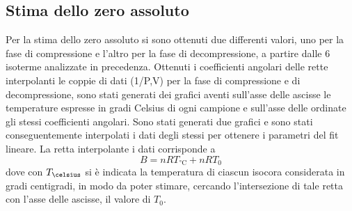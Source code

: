 \documentclass[a4paper,11pt,oneside]{article}
\begin{document}


\subsection{Stima dello zero assoluto}
Per la stima dello zero assoluto si sono ottenuti due differenti valori, uno per la fase di compressione e l'altro per la fase di decompressione, a partire dalle 6 isoterme analizzate in precedenza.
Ottenuti i coefficienti angolari delle rette interpolanti le coppie di dati (1/P,V) per la fase di compressione e di decompressione, sono stati generati dei grafici aventi sull'asse delle ascisse le temperature espresse in gradi Celsius di ogni campione e sull'asse delle ordinate gli stessi coefficienti angolari. Sono stati generati due grafici e sono stati conseguentemente interpolati i dati degli stessi per ottenere i parametri del fit lineare. La retta interpolante i dati corrisponde a 
\begin{equation*}
    B=n R T_{\si{\celsius}} + n R T_{0}
\end{equation*}
dove con $T_{\celsius}$ si è indicata la temperatura di ciascun isocora considerata in gradi centigradi, in modo da poter stimare, cercando l'intersezione di tale retta con l'asse delle ascisse, il valore di $T_0$. \newline
\end{document}
